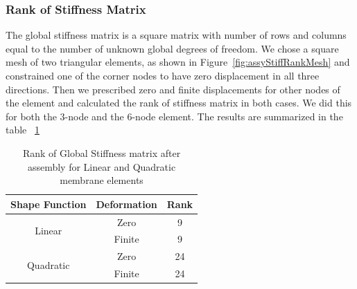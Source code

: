 \documentclass[../main.tex]{subfiles}
\begin{document}
\subsubsection{Rank of Stiffness Matrix}
The global stiffness matrix is a square matrix with number of rows and
columns equal to the number of unknown global degrees of freedom. We
chose a square mesh of two triangular elements, as shown in
Figure~\ref{fig:assyStiffRankMesh} and constrained one of the corner
nodes to have zero displacement in all three directions. Then we
prescribed zero and finite displacements for other nodes of the
element and calculated the rank of stiffness matrix in both cases. We
did this for both the 3-node and the 6-node element. The results are
summarized in the table ~\ref{tab:assyStiffness}
\begin{table}
  \centering
  \caption{Rank of Global Stiffness matrix after assembly for Linear and Quadratic membrane elements}
  \label{tab:assyStiffness}
  \begin{tabular}{|c|c|c|}
    \hline
    Shape Function & Deformation &  Rank \\
    \hline
    \multirow{2}{*}{Linear} & Zero & 9 \\
    \cline{2-3}                
                   & Finite & 9 \\
    \hline
    \multirow{2}{*}{Quadratic} & Zero & 24 \\
    \cline{2-3}                
                   & Finite & 24 \\
    \hline
  \end{tabular}
\end{table}
\end{document}
